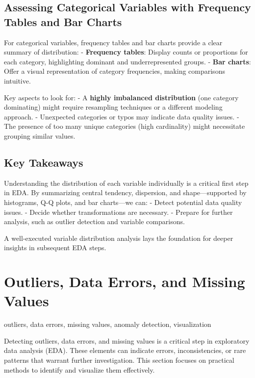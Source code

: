 \documentclass[12pt,openany]{book}
\begin{document}
\subsection{Assessing Categorical Variables with Frequency Tables and Bar Charts}

For categorical variables, frequency tables and bar charts provide a clear summary of distribution:
- \textbf{Frequency tables}: Display counts or proportions for each category, highlighting dominant and underrepresented groups.
- \textbf{Bar charts}: Offer a visual representation of category frequencies, making comparisons intuitive.

Key aspects to look for:
- A \textbf{highly imbalanced distribution} (one category dominating) might require resampling techniques or a different modeling approach.
- Unexpected categories or typos may indicate data quality issues.
- The presence of too many unique categories (high cardinality) might necessitate grouping similar values.


\subsection{Key Takeaways}

Understanding the distribution of each variable individually is a critical first step in EDA. By summarizing central tendency, dispersion, and shape—supported by histograms, Q-Q plots, and bar charts—we can:
- Detect potential data quality issues.
- Decide whether transformations are necessary.
- Prepare for further analysis, such as outlier detection and variable comparisons.

A well-executed variable distribution analysis lays the foundation for deeper insights in subsequent EDA steps.



\section{Outliers, Data Errors, and Missing Values}

\begin{keywordsbox}
outliers, data errors, missing values, anomaly detection, visualization
\end{keywordsbox}

Detecting outliers, data errors, and missing values is a critical step in 
exploratory data analysis (EDA). These elements can indicate errors, 
inconsistencies, or rare patterns that warrant further investigation. 
This section focuses on practical methods to identify and visualize them 
effectively.
\end{document}
